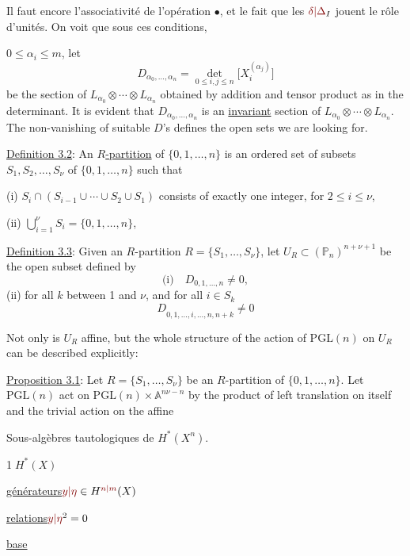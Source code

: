 Il faut encore  l'associativité de l'opération $\bullet$, et le fait que les $\unsure{\delta|\Delta}_I$ jouent le rôle d'unités. On voit que sous ces conditions,


$0\leq\alpha_i\leq m$, let
\[
D_{\alpha_0,\ldots,\alpha_n}=\det_{0\leq i,j\leq n}\bigl[X_i^{(\alpha_j)}\bigr]
\]
be the section of $L_{\alpha_0}\otimes\cdots\otimes L_{\alpha_n}$ obtained by addition and tensor product as in the determinant. It is evident that $D_{\alpha_0,\ldots,\alpha_n}$ is an \uline{invariant} section of $L_{\alpha_0}\otimes\cdots\otimes L_{\alpha_n}$. The non-vanishing of suitable $D$'s defines the open sets we are looking for.

\uline{Definition 3.2}: An \uline{$R$-partition} of $\{0,1,\ldots,n\}$ is an ordered set of subsets $S_1,S_2,\ldots,S_\nu$ of $\{0,1,\ldots,n\}$ such that

(i) $S_i\cap(S_{i-1}\cup\cdots\cup S_2\cup S_1)$ consists of exactly one integer, for $2\leq i\leq\nu$,

(ii) $\displaystyle\bigcup_{i=1}^{\nu}S_i=\{0,1,\ldots,n\}$,

\uline{Definition 3.3}: Given an $R$-partition $R=\{S_1,\ldots,S_\nu\}$, let $U_R\subset(\mathbb{P}_n)^{n+\nu+1}$ be the open subset defined by
\[
\text{(i)}\quad D_{0,1,\ldots,n}\ne0,
\]
(ii) for all $k$ between 1 and $\nu$, and for all $i\in S_k$
\[
D_{0,1,\ldots,\widehat i,\ldots,n,n+k}\ne0
\]

Not only is $U_R$ affine, but the whole structure of the action of $\mathrm{PGL}(n)$ on $U_R$ can be described explicitly:

\uline{Proposition 3.1}: Let $R=\{S_1,\ldots,S_\nu\}$ be an $R$-partition of $\{0,1,\ldots,n\}$. Let $\mathrm{PGL}(n)$ act on $\mathrm{PGL}(n)\times\mathbb{A}^{n\nu-n}$ by the product of left translation on itself and the trivial action on the affine


Sous-algèbres tautologiques de $H^*(X^n)$.

\textcircled{1}\quad\uline{$H^*(X)$}

\uline{générateurs}\quad $\unsure{y|\eta}\in H^{\unsure{n|m}}(X)$

\uline{relations}\quad $\unsure{y|\eta}^2=0$

\uline{base}

